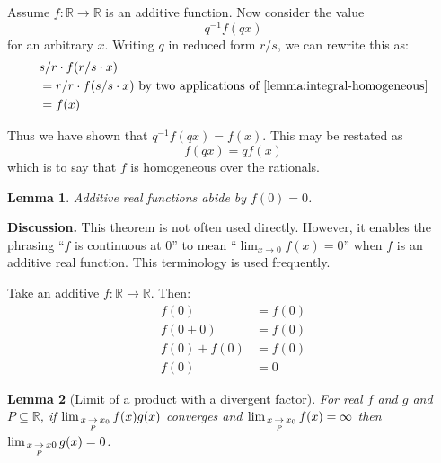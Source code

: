 \documentclass{article}
\theoremstyle{mytheoremstyle}
\newtheorem{lemma}{Lemma}
\renewenvironment{proof}[1][\proofname]{\noindent{\bfseries #1. }}{\begin{flushright}\smiley\end{flushright}}
\newcommand{\discussion}{\noindent\textbf{Discussion.} }
\begin{document}
\begin{proof}
Assume $f : \mathbb R \to \mathbb R$ is an additive function. Now consider the value
$$ q^{-1}f(qx) $$
for an arbitrary $x$. Writing $q$ in reduced form $r/s$, we can rewrite this as:
\begin{align*}
    & s/r\cdot f( r/s \cdot x) \\
    &= r/r\cdot f( s/s \cdot x ) \text{ by two applications of \cref{lemma:integral-homogeneous}} \\
    &= f(x)
\end{align*}

Thus we have shown that $ q^{-1}f(qx) = f(x) $. This may be restated as
$$ f(qx) = qf(x) $$
which is to say that $f$ is homogeneous over the rationals.
\end{proof}


\begin{lemma}
\label{lemma:additive-zero}
Additive real functions abide by $f(0) = 0$.
\end{lemma}

\discussion This theorem is not often used directly. However, it enables the phrasing ``$f$ is continuous at 0'' to mean ``$\lim_{x \to 0} f(x) = 0$'' when $f$ is an additive real function. This terminology is used frequently.

\begin{proof} Take an additive $f : \mathbb R \to \mathbb R$. Then:
\begin{align*}
    f(0) &= f(0) \\
    f(0 + 0) &= f(0) \\
    f(0) + f(0) &= f(0) \\
    f(0) &= 0
\end{align*}
\end{proof}


\begin{lemma}[Limit of a product with a divergent factor]
\label{lemma:product-limit}
For real $f$ and $g$ and $P \subseteq \mathbb R$, if $ \limx{P}{x}{x_0} f(x) g(x) $ converges and $ \limx{P}{x}{x_0} f(x) = \infty $ then $ \limx{P}{x}{x0} g(x) = 0 $.
\end{lemma}
\end{document}
